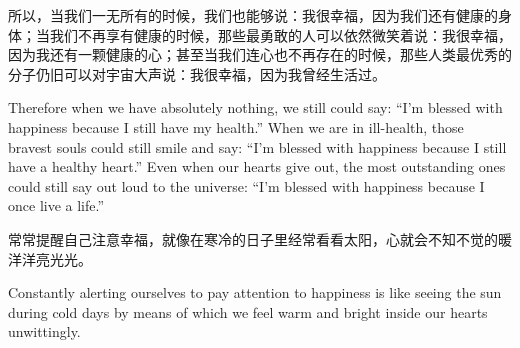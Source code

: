 {所以，当我们一无所有的时候，我们也能够说：我很幸福，因为我们还有健康的身体；当我们不再享有健康的时候，那些最勇敢的人可以依然微笑着说：我很幸福，因为我还有一颗健康的心；甚至当我们连心也不再存在的时候，那些人类最优秀的分子仍旧可以对宇宙大声说：我很幸福，因为我曾经生活过。

Therefore when we have absolutely nothing, we still could say: “I'm blessed with happiness because I still have my health.” When we are in ill-health, those bravest souls could still smile and say: “I'm blessed with happiness because I still have a healthy heart.” Even when our hearts give out, the most outstanding ones could still say out loud to the universe: “I'm blessed with happiness because I once live a life.”

常常提醒自己注意幸福，就像在寒冷的日子里经常看看太阳，心就会不知不觉的暖洋洋亮光光。

Constantly alerting ourselves to pay attention to happiness is like seeing the sun during cold days by means of which we feel warm and bright inside our hearts unwittingly.
}